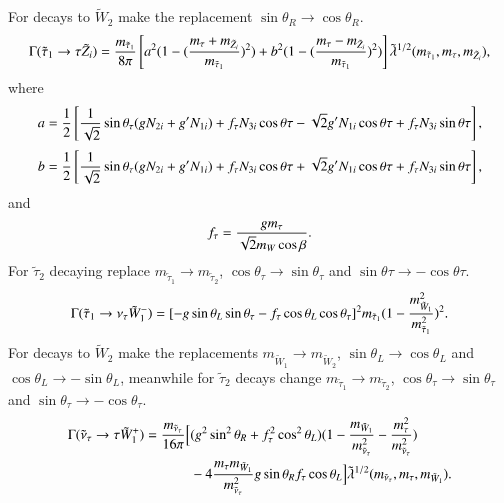 \documentclass[final,3p,times]{elsarticle}
\begin{document}
For decays to $\tilde{W}_2$ make the replacement $\sin\theta_R \rightarrow \cos\theta_R$.
\begin{equation}\label{stau1tauneut}
\begin{aligned}
\Gamma (\tilde{\tau}_1 \rightarrow \tau \tilde{Z}_i) = {m_{\tilde{\tau}_1} \over 8\pi} \left[a^2 (1- ({m_\tau + m_{\tilde{Z}_i} \over m_{\tilde{\tau}_1}})^2) + b^2 (1- ({m_\tau - m_{\tilde{Z}_i} \over m_{\tilde{\tau}_1}})^2)\right] \tilde{\lambda}^{1/2}(m_{\tilde{\tau}_1}, m_\tau, m_{\tilde{Z}_i}),
\end{aligned}
\end{equation} 
where
\begin{equation}
a = \frac{1}{2}\left[{1 \over \sqrt{2}}\sin\theta_\tau (g N_{2i} + g' N_{1i}) + f_\tau N_{3i} \cos\theta\tau - \sqrt{2} g' N_{1i}\cos\theta\tau + f_\tau N_{3i} \sin\theta\tau\right],
\end{equation}
\begin{equation}
b = \frac{1}{2}\left[{1 \over \sqrt{2}}\sin\theta_\tau (g N_{2i} + g' N_{1i}) + f_\tau N_{3i} \cos\theta\tau + \sqrt{2} g' N_{1i}\cos\theta\tau + f_\tau N_{3i} \sin\theta\tau\right],
\end{equation}
and
\begin{equation} \label{funderscoretau}
f_\tau = {g m_\tau \over \sqrt{2}m_W \cos\beta}.
\end{equation}	
For $\tilde{\tau}_2$ decaying replace $m_{\tilde{\tau}_1} \rightarrow m_{\tilde{\tau}_2}$, $\cos\theta_\tau \rightarrow \sin\theta_\tau$ and $\sin\theta\tau \rightarrow -\cos\theta\tau$.
\begin{equation}\label{stau1nutauch1}
\begin{aligned}
\Gamma (\tilde{\tau}_1 \rightarrow \nu_\tau \tilde{W}_{1}^{-}) = [-g\sin\theta_L\sin\theta_\tau - f_\tau \cos\theta_L\cos\theta_\tau]^2 m_{\tilde{\tau}_1} (1 - {m_{\tilde{W}_1}^2 \over m_{\tilde{\tau}_1}^2})^2.
\end{aligned}
\end{equation} 
For decays to $\tilde{W}_2$ make the replacements $m_{\tilde{W}_1} \rightarrow m_{\tilde{W}_2}$, $\sin\theta_L \rightarrow \cos\theta_L$ and $\cos\theta_L \rightarrow -\sin\theta_L$, meanwhile for $\tilde{\tau}_2$ decays change $m_{\tilde{\tau}_1} \rightarrow m_{\tilde{\tau}_2}$, $\cos\theta_\tau \rightarrow \sin\theta_\tau$ and $\sin\theta_\tau \rightarrow -\cos\theta_\tau$.
\begin{equation}\label{snutautauch1}
\begin{aligned}
\Gamma (\tilde{\nu}_\tau \rightarrow \tau \tilde{W}_{1}^{+}) = {m_{\tilde{\nu}_\tau} \over 16\pi} \Big[& (g^2 \sin^2\theta_R + f_\tau^2 \cos^2\theta_L)(1 - {m_{\tilde{W}_1} \over m_{\tilde{\nu}_\tau}^2} -  {m_{\tau}^2 \over m_{\tilde{\nu}_\tau}^2})  \\ & - 4{m_\tau m_{\tilde{W}_1} \over m_{\tilde{\nu}_\tau}^2} g\sin\theta_R f_\tau \cos\theta_L \Big] \tilde{\lambda}^{1/2} (m_{\tilde{\nu}_\tau}, m_\tau, m_{\tilde{W}_1}).
\end{aligned}
\end{equation} 
\end{document}
